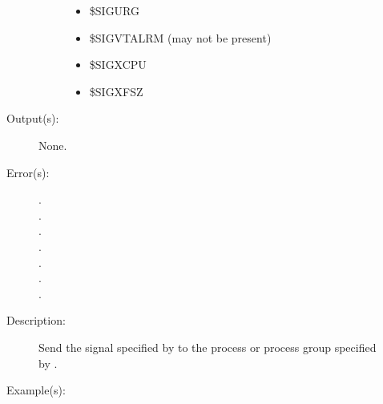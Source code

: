 \begin{description}
\begin{description}
\begin{description}
\begin{itemize}
 			\item{\$SIGURG}
 			\item{\$SIGVTALRM (may not be present)}
 			\item{\$SIGXCPU}
 			\item{\$SIGXFSZ}
			\end{itemize}
		\end{description}
	\item[Output(s): ] None.
	\item[Error(s): ]
		\begin{description}\item[]
		\item[.]
		\item[.]
		\item[.]
		\item[.]
		\item[.]
		\item[.]
		\item[.]
		\end{description}
	\item[Description: ]
		Send the signal specified by  to the process or
		process group specified by .
	\item[Example(s): ]\begin{verbatim}


\end{verbatim}
\end{description}
\end{description}
